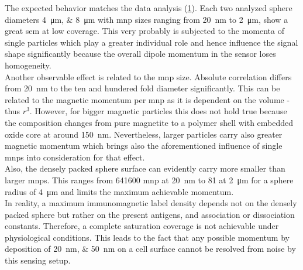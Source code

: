 The expected behavior matches the data analysis (\cref{fig:sim:coverage}). Each two analyzed sphere diameters \SIlist{4;8}{\micro\meter} with \gls{mnp} sizes ranging from \SI{20}{\nano\meter} to \SI{2}{\micro\meter}, show a great \gls{sem} at low coverage. This very probably is subjected to the momenta of single particles which play a greater individual role and hence influence the signal shape significantly because the overall dipole momentum in the sensor loses homogeneity. \\
Another observable effect is related to the \gls{mnp} size. Absolute correlation differs from \SI{20}{\nano\meter} to the ten and hundered fold diameter significantly. This can be related to the magnetic momentum per \gls{mnp} as it is dependent on the volume - thus $r^3$. However, for bigger magnetic particles this does not hold true because the composition changes from pure magnetite to a polymer shell with embedded oxide core at around \SI{150}{\nano\meter}. Nevertheless, larger particles carry also greater magnetic momentum which brings also the aforementioned influence of single \glspl{mnp} into consideration for that effect. \\ 
Also, the densely packed sphere surface can evidently carry more smaller than larger \glspl{mnp}. This ranges from \num{641600} \gls{mnp} at \SI{20}{\nano\meter} to \num{81} at \SI{2}{\micro\meter} for a sphere radius of \SI{4}{\micro\meter} and limits the maximum achievable momentum. \\
In reality, a maximum immunomagnetic label density depends not on the densely packed sphere but rather on the present antigens, and association or dissociation constants. Therefore, a complete saturation coverage is not achievable under physiological conditions. This leads to the fact that any possible momentum by deposition of \SIlist{20;50}{\nano\meter} on a cell surface cannot be resolved from noise by this sensing setup.

\begin{figure}
	\centering
	 \hfill
	\addtocounter{subfigure}{-1}
	 \\
	\vspace{\baselineskip}	
	\addtocounter{subfigure}{-1}
	\hfill
	\addtocounter{subfigure}{-1}
\label{fig:sim:coverage}
\end{figure}


